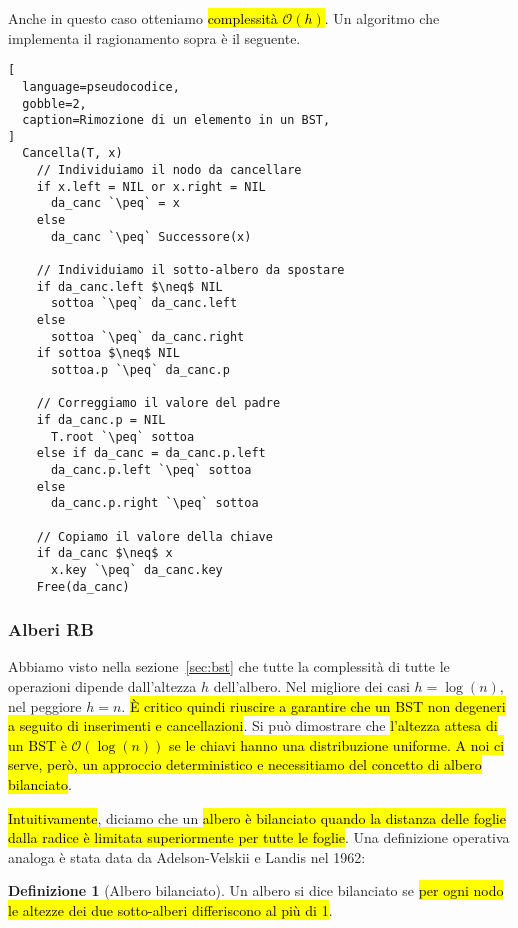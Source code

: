 \documentclass[a4paper,11pt,twoside]{article}
\theoremstyle{plain}
\theoremstyle{definition}
\newtheorem{defn}{Definizione}[section]
\theoremstyle{remark}
\newcommand{\peq}{$\gets$}
\begin{document}
\noindent Anche in questo caso otteniamo \hl{complessità $\mathcal{O}(h)$}. Un
algoritmo che implementa il ragionamento sopra è il seguente.

\begin{lstlisting}[
  language=pseudocodice,
  gobble=2,
  caption=Rimozione di un elemento in un BST,
]
  Cancella(T, x)
    // Individuiamo il nodo da cancellare
    if x.left = NIL or x.right = NIL
      da_canc `\peq` = x
    else
      da_canc `\peq` Successore(x)

    // Individuiamo il sotto-albero da spostare
    if da_canc.left $\neq$ NIL
      sottoa `\peq` da_canc.left
    else
      sottoa `\peq` da_canc.right
    if sottoa $\neq$ NIL
      sottoa.p `\peq` da_canc.p

    // Correggiamo il valore del padre
    if da_canc.p = NIL
      T.root `\peq` sottoa
    else if da_canc = da_canc.p.left
      da_canc.p.left `\peq` sottoa
    else
      da_canc.p.right `\peq` sottoa

    // Copiamo il valore della chiave
    if da_canc $\neq$ x
      x.key `\peq` da_canc.key
    Free(da_canc)
\end{lstlisting}

\subsubsection{Alberi RB}\label{sec:rbt}

Abbiamo visto nella sezione~\ref{sec:bst} che tutte la complessità di tutte le
operazioni dipende dall'altezza $h$ dell'albero. Nel migliore dei casi $h =
\log(n)$, nel peggiore $h = n$. \hl{È critico quindi riuscire a garantire che un
BST non degeneri a seguito di inserimenti e cancellazioni}. Si può dimostrare
che \hl{l'altezza attesa di un BST è $\mathcal{O}(\log(n))$ se le chiavi hanno
una distribuzione uniforme. A noi ci serve, però, un approccio deterministico e
necessitiamo del concetto di albero bilanciato}.

\hl{Intuitivamente}, diciamo che un \hl{albero è bilanciato quando la distanza
delle foglie dalla radice è limitata superiormente per tutte le foglie}. Una
definizione operativa analoga è stata data da Adelson-Velskii e Landis nel 1962:

\begin{defn}[Albero bilanciato]\label{def:balanced-tree}
  Un albero si dice bilanciato se \hl{per ogni nodo le altezze dei due
  sotto-alberi differiscono al più di 1}.
\end{defn}
\end{document}
